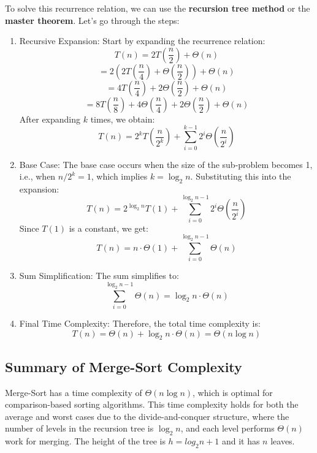     To solve this recurrence relation, we can use the \textbf{recursion tree method} or the \textbf{master theorem}. Let's go through the steps:
    \begin{enumerate}
        \item Recursive Expansion: Start by expanding the recurrence relation:
       \[
       T(n) = 2T\left(\frac{n}{2}\right) + \Theta(n)
       \]
       \[
       = 2\left(2T\left(\frac{n}{4}\right) + \Theta\left(\frac{n}{2}\right)\right) + \Theta(n)
       \]
       \[
       = 4T\left(\frac{n}{4}\right) + 2\Theta\left(\frac{n}{2}\right) + \Theta(n)
       \]
       \[
       = 8T\left(\frac{n}{8}\right) + 4\Theta\left(\frac{n}{4}\right) + 2\Theta\left(\frac{n}{2}\right) + \Theta(n)
       \]
       After expanding \(k\) times, we obtain:
       \[
       T(n) = 2^k T\left(\frac{n}{2^k}\right) + \sum_{i=0}^{k-1} 2^i \Theta\left(\frac{n}{2^i}\right)
       \] 
        \item Base Case:
       The base case occurs when the size of the sub-problem becomes 1, i.e., when \(n/2^k = 1\), which implies \(k = \log_2 n\). Substituting this into the expansion:
       \[
       T(n) = 2^{\log_2 n} T(1) + \sum_{i=0}^{\log_2 n - 1} 2^i \Theta\left(\frac{n}{2^i}\right)
       \]
       Since \(T(1)\) is a constant, we get:
       \[
       T(n) = n \cdot \Theta(1) + \sum_{i=0}^{\log_2 n - 1} \Theta(n)
       \]
        \item Sum Simplification:
       The sum simplifies to:
       \[
       \sum_{i=0}^{\log_2 n - 1} \Theta(n) = \log_2 n \cdot \Theta(n)
       \]
        \item Final Time Complexity:
       Therefore, the total time complexity is:
       \[
       T(n) = \Theta(n) + \log_2 n \cdot \Theta(n) = \Theta(n \log n)
       \]
    \end{enumerate}
        
    \subsection{Summary of Merge-Sort Complexity}
    
    Merge-Sort has a time complexity of \(\Theta(n \log n)\), which is optimal for comparison-based sorting algorithms. This time complexity holds for both the average and worst cases due to the divide-and-conquer structure, where the number of levels in the recursion tree is \(\log_2 n\), and each level performs \(\Theta(n)\) work for merging. The height of the tree is $h = log_2 n + 1$ and it has $n$ leaves.

